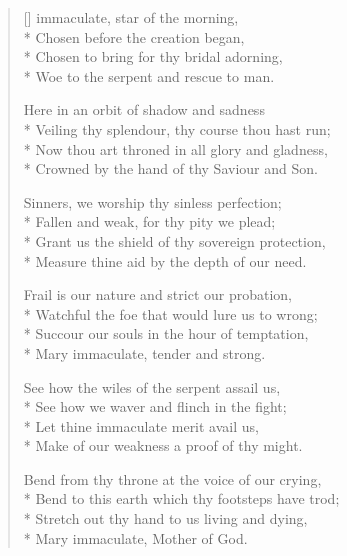 \newHymn
{}
\settowidth{\versewidth}{Mary immaculate, star of the morning}

\begin{verse}[\versewidth]
 immaculate, star of the morning,\\*
Chosen before the creation began,\\*
Chosen to bring for thy bridal adorning,\\*
Woe to the serpent and rescue to man.

 Here in an orbit of shadow and sadness\\*
Veiling thy splendour, thy course thou hast run;\\*
Now thou art throned in all glory and gladness,\\*
Crowned by the hand of thy Saviour and Son.

 Sinners, we worship thy sinless perfection;\\*
Fallen and weak, for thy pity we plead;\\*
Grant us the shield of thy sovereign protection,\\*
Measure thine aid by the depth of our need.

 Frail is our nature and strict our probation,\\*
Watchful the foe that would lure us to wrong;\\*
Succour our souls in the hour of temptation,\\*
Mary immaculate, tender and strong.

 See how the wiles of the serpent assail us,\\*
See how we waver and flinch in the fight;\\*
Let thine immaculate merit avail us,\\*
Make of our weakness a proof of thy might.

 Bend from thy throne at the voice of our crying,\\*
Bend to this earth which thy footsteps have trod;\\*
Stretch out thy hand to us living and dying,\\*
Mary immaculate, Mother of God.

\end{verse}





